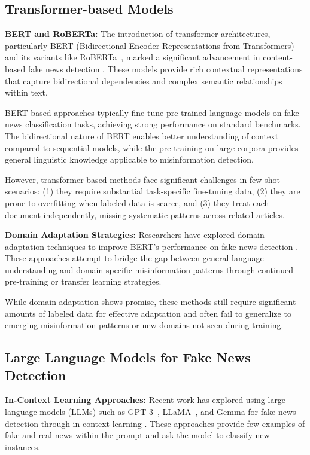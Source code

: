 \subsection{Transformer-based Models}

\textbf{BERT and RoBERTa:} The introduction of transformer architectures, particularly BERT (Bidirectional Encoder Representations from Transformers)~\cite{devlin2018bert} and its variants like RoBERTa~\cite{liu2019roberta}, marked a significant advancement in content-based fake news detection \cite{kula2021survey, kaliyar2021fakebert}. These models provide rich contextual representations that capture bidirectional dependencies and complex semantic relationships within text.

BERT-based approaches typically fine-tune pre-trained language models on fake news classification tasks, achieving strong performance on standard benchmarks. The bidirectional nature of BERT enables better understanding of context compared to sequential models, while the pre-training on large corpora provides general linguistic knowledge applicable to misinformation detection.

However, transformer-based methods face significant challenges in few-shot scenarios: (1) they require substantial task-specific fine-tuning data, (2) they are prone to overfitting when labeled data is scarce, and (3) they treat each document independently, missing systematic patterns across related articles.

\textbf{Domain Adaptation Strategies:} Researchers have explored domain adaptation techniques to improve BERT's performance on fake news detection \cite{wright2020domain, silva2021cross}. These approaches attempt to bridge the gap between general language understanding and domain-specific misinformation patterns through continued pre-training or transfer learning strategies.

While domain adaptation shows promise, these methods still require significant amounts of labeled data for effective adaptation and often fail to generalize to emerging misinformation patterns or new domains not seen during training.

\subsection{Large Language Models for Fake News Detection}

\textbf{In-Context Learning Approaches:} Recent work has explored using large language models (LLMs) such as GPT-3~\cite{openai2023gpt4}, LLaMA~\cite{touvron2023llama}, and Gemma for fake news detection through in-context learning \cite{chen2023combating}. These approaches provide few examples of fake and real news within the prompt and ask the model to classify new instances.

